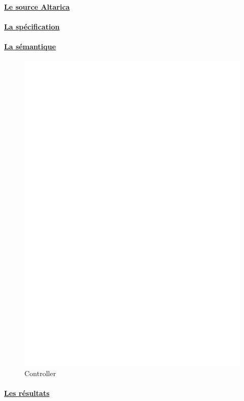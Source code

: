     \paragraph{\underline{Le source Altarica\\}}
    
    
    \paragraph{\underline{La spécification\\}}
    
    
    \paragraph{\underline{La sémantique\\}}
    \begin{figure}[!ht]
     \begin{center}
      \includegraphics[width=16cm]{../src/altarica/Controller.eps}
      \caption{Controller}
     \end{center}
    \end{figure}

    \paragraph{\underline{Les résultats\\}}
    
    
